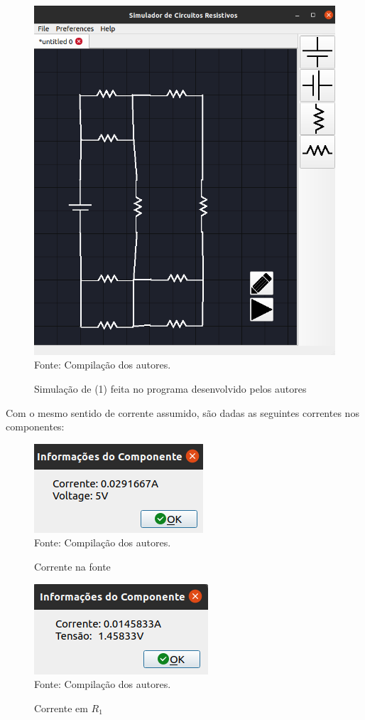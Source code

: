 \documentclass[twocolumn, 10pt]{extarticle}
\begin{document}
\begin{figure}[H]
	\caption{Simulação de (1) feita no programa desenvolvido pelos autores} 
	\centering
	\includegraphics[scale=0.2]{circuitsim1}
	\\ Fonte: Compilação dos autores.
\end{figure}

Com o mesmo sentido de corrente assumido, são dadas as seguintes correntes nos componentes:

\begin{figure}[H]
	\caption{Corrente na fonte} 
	\centering
	\includegraphics[scale=0.7]{iv}
	\\ Fonte: Compilação dos autores.
\end{figure}

\begin{figure}[H]
	\caption{Corrente em $R_1$} 
	\centering
	\includegraphics[scale=0.7]{ir1}
	\\ Fonte: Compilação dos autores.
\end{figure}
\end{document}
